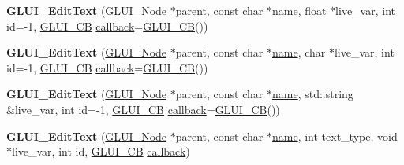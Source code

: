 \begin{DoxyCompactItemize}
\item 
\hypertarget{classGLUI__EditText_adad7d18bc05da4e6aecfea680c0a0a65}{{\bfseries G\-L\-U\-I\-\_\-\-Edit\-Text} (\hyperlink{classGLUI__Node}{G\-L\-U\-I\-\_\-\-Node} $\ast$parent, const char $\ast$\hyperlink{classGLUI__Control_aa95b97d50df45335fc33f0af03958eb3}{name}, float $\ast$live\-\_\-var, int id=-\/1, \hyperlink{classGLUI__CB}{G\-L\-U\-I\-\_\-\-C\-B} \hyperlink{classGLUI__Control_a96060fe0cc6d537e736dd6eef78e24ab}{callback}=\hyperlink{classGLUI__CB}{G\-L\-U\-I\-\_\-\-C\-B}())}\label{classGLUI__EditText_adad7d18bc05da4e6aecfea680c0a0a65}

\item 
\hypertarget{classGLUI__EditText_a85fadf933a22982801659cec28d159f1}{{\bfseries G\-L\-U\-I\-\_\-\-Edit\-Text} (\hyperlink{classGLUI__Node}{G\-L\-U\-I\-\_\-\-Node} $\ast$parent, const char $\ast$\hyperlink{classGLUI__Control_aa95b97d50df45335fc33f0af03958eb3}{name}, char $\ast$live\-\_\-var, int id=-\/1, \hyperlink{classGLUI__CB}{G\-L\-U\-I\-\_\-\-C\-B} \hyperlink{classGLUI__Control_a96060fe0cc6d537e736dd6eef78e24ab}{callback}=\hyperlink{classGLUI__CB}{G\-L\-U\-I\-\_\-\-C\-B}())}\label{classGLUI__EditText_a85fadf933a22982801659cec28d159f1}

\item 
\hypertarget{classGLUI__EditText_a721bd71256ee84de33682e0bf926e6a3}{{\bfseries G\-L\-U\-I\-\_\-\-Edit\-Text} (\hyperlink{classGLUI__Node}{G\-L\-U\-I\-\_\-\-Node} $\ast$parent, const char $\ast$\hyperlink{classGLUI__Control_aa95b97d50df45335fc33f0af03958eb3}{name}, std\-::string \&live\-\_\-var, int id=-\/1, \hyperlink{classGLUI__CB}{G\-L\-U\-I\-\_\-\-C\-B} \hyperlink{classGLUI__Control_a96060fe0cc6d537e736dd6eef78e24ab}{callback}=\hyperlink{classGLUI__CB}{G\-L\-U\-I\-\_\-\-C\-B}())}\label{classGLUI__EditText_a721bd71256ee84de33682e0bf926e6a3}

\item 
\hypertarget{classGLUI__EditText_a5aa2fc60832f1c93046a047084256474}{{\bfseries G\-L\-U\-I\-\_\-\-Edit\-Text} (\hyperlink{classGLUI__Node}{G\-L\-U\-I\-\_\-\-Node} $\ast$parent, const char $\ast$\hyperlink{classGLUI__Control_aa95b97d50df45335fc33f0af03958eb3}{name}, int text\-\_\-type, void $\ast$live\-\_\-var, int id, \hyperlink{classGLUI__CB}{G\-L\-U\-I\-\_\-\-C\-B} \hyperlink{classGLUI__Control_a96060fe0cc6d537e736dd6eef78e24ab}{callback})}\label{classGLUI__EditText_a5aa2fc60832f1c93046a047084256474}

\end{DoxyCompactItemize}
